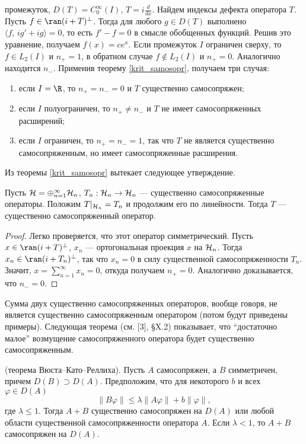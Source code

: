 \documentclass[a4paper
]{article}
\begin{document}
промежуток, $D(T)=C_0^\infty(I)$, $T=i\frac{d}{dx}$. Найдем индексы
дефекта оператора $T$. Пусть $f\in \ran (i+T)^\bot$. Тогда для любого
$g\in D(T)$ выполнено $\langle f, \, ig'+ig\rangle=0$, то есть
$f'-f=0$ в смысле обобщенных функций. Решив это уравнение, получаем
$f(x)=ce^x$. Если промежуток $I$ ограничен сверху, то $f\in L_2(I)$ и $n_+=1$,
в обратном случае $f\notin L_2(I)$ и $n_+=0$. Аналогично находится
$n_-$. Применив теорему \ref{krit_samosopr}, получаем три случая:
\begin{enumerate}
\item если $I=\R$, то $n_+=n_-=0$ и $T$ существенно самосопряжен;
\item если $I$ полуограничен, то $n_+\ne n_-$ и $T$ не имеет самосопряженных
расширений;
\item если $I$ ограничен, то $n_+=n_-=1$, так что $T$ не является
существенно самосопряженным, но имеет самосопряженные расширения.
\end{enumerate}
\par
Из теоремы \ref{krit_samosopr} вытекает следующее утверждение.
\begin{Cor}
\label{cor_sum_oper}
Пусть ${\cal H}=\oplus _{n=1}^{\infty} {\cal H}_n$, $T_n:{\cal H}_n
\rightarrow {\cal H}_n$ --- существенно самосопряженные операторы.
Положим $T|_{{\cal H}_n}=T_n$ и продолжим его по линейности.
Тогда $T$ --- существенно самосопряженный оператор.
\end{Cor}
\begin{proof}
Легко проверяется, что этот оператор симметрический. Пусть $x\in
\ran (i+T)^{\bot}$, $x_n$ --- ортогональная проекция $x$ на ${\cal H}_n$.
Тогда $x_n\in \ran (i+T_n)^{\bot}$, так что $x_n=0$ в силу существенной
самосопряженности $T_n$. Значит, $x=\sum \limits_{n=1}^\infty x_n=0$,
откуда получаем $n_+=0$. Аналогично доказывается, что $n_-=0$.
\end{proof}
Сумма двух существенно самосопряженных операторов, вообще говоря, не
является существенно самосопряженным оператором (потом будут приведены
примеры). Следующая теорема (см. [3], \S X.2) показывает, что ``достаточно
малое'' возмущение самосопряженного оператора будет существенно
самосопряженным.
\begin{Trm}
\label{vust}
(теорема Вюста--Като--Реллиха). Пусть $A$ самосопряжен, а $B$ симметричен,
причем $D(B)\supset D(A)$. Предположим, что для некоторого $b$ и всех
$\varphi\in D(A)$ $$\|B\varphi\|\le \lambda\|A\varphi\|+b\|\varphi\|,$$
где $\lambda\le 1$. Тогда $A+B$ существенно самосопряжен на $D(A)$ или
любой области существенной самосопряженности оператора $A$. Если $\lambda<1$,
то $A+B$ самосопряжен на $D(A)$.
\end{Trm}
\end{document}
